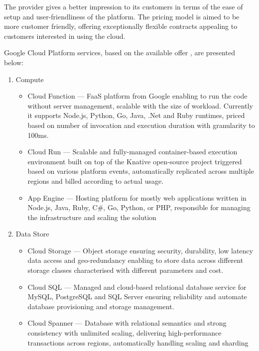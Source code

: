 The provider gives a better impression to its customers in terms of the ease of setup and user-friendliness of the platform. The pricing model is aimed to be more customer friendly, offering exceptionally flexible contracts appealing to customers interested in using the cloud.

Google Cloud Platform services, based on the available offer \cite{GCPServerlessOffering}, are presented below:


\begin{enumerate}
   \item Compute
   \begin{itemize}
       \item Cloud Function --- FaaS platform from Google enabling to run the code without server management, scalable with the size of workload. Currently it supports Node.js, Python, Go, Java, .Net and Ruby runtimes, priced based on number of invocation and execution duration with granularity to 100ms.
       \item Cloud Run --- Scalable and fully-managed container-based execution environment built on top of the Knative open-source project triggered based on various platform events, automatically replicated across multiple regions and billed according to actual usage.
       \item App Engine --- Hosting platform for mostly web applications written in Node.js, Java, Ruby, C\#, Go, Python, or PHP, responsible for managing the infrastructure and scaling the solution
   \end{itemize}
   \item Data Store
   \begin{itemize}
       \item Cloud Storage --- Object storage ensuring security, durability, low latency data access and geo-redundancy enabling to store data across different storage classes characterised with different parameters and cost.
       \item Cloud SQL --- Managed and cloud-based relational database service for MySQL, PostgreSQL and SQL Server ensuring reliability and automate database provisioning and storage management.
       \item Cloud Spanner --- Database with relational semantics and strong consistency with unlimited scaling, delivering high-performance transactions across regions, automatically handling scaling and sharding

\end{itemize}
\end{enumerate}
